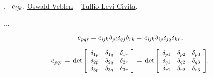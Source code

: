 ,
~${e_{i\hspace{-0.1ex}j\hspace{-0.1ex}k}}$.
\href{https://en.wikipedia.org/wiki/Oswald_Veblen}{Oswald Veblen}
~%
\href{https://en.wikipedia.org/wiki/Tullio_Levi-Civita}{Tullio Levi\hbox{-}Civita}.

...


\nopagebreak\vspace{-0.2em}\begin{equation*}
e_{pqr} \hspace{-0.2ex}
= e_{i\hspace{-0.1ex}j\hspace{-0.1ex}k} \hspace{.1ex} \delta_{pi} \delta_{\hspace{-0.1ex}qj} \delta_{rk} \hspace{-0.2ex}
= e_{i\hspace{-0.1ex}j\hspace{-0.1ex}k} \hspace{.1ex} \delta_{ip} \delta_{\hspace{-0.15ex}j\hspace{-0.1ex}q} \delta_{kr}
\hspace{.1ex} ,
\end{equation*}

\nopagebreak\vspace{-0.1em}
\begin{equation}\label{permutationsymbolasdeterminant}
e_{pqr} \hspace{-0.1ex}
= \hspace{.1ex}
\determinant\hspace{-0.25ex} \scalebox{.92}{$\left[ \begin{array}{ccc}
\delta_{1p} & \delta_{1q} & \delta_{1r} \\
\delta_{2p} & \delta_{2q} & \delta_{2r} \\
\delta_{3p} & \delta_{3q} & \delta_{3r}
\end{array} \hspace{-0.1ex} \right]$} \hspace{-0.2ex}
= \hspace{.1ex}
\determinant\hspace{-0.25ex} \scalebox{.92}{$\left[ \begin{array}{ccc}
\delta_{p1} & \delta_{p2} & \delta_{p3} \\
\delta_{q1} & \delta_{q2} & \delta_{q3} \\
\delta_{r1} & \delta_{r2} & \delta_{r3}
\end{array} \hspace{-0.1ex} \right]$}
\hspace{-0.2ex} .
\end{equation}

